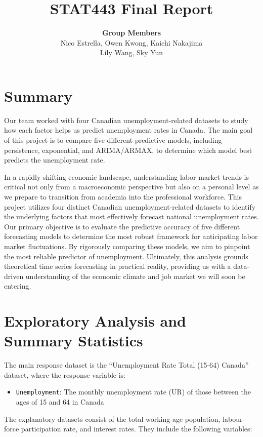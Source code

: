 \documentclass[]{article}
\title{STAT443 Final Report}
\author{
\textbf{Group Members}\\
Nico Estrella,
Owen Kwong,
Kaichi Nakajima\\
Lily Wang,
Sky Yun
}
\begin{document}
\maketitle

\section{Summary}
Our team worked with four Canadian unemployment-related datasets to study how each factor helps us predict unemployment rates in Canada. The main goal of this project is to compare five different predictive models, including persistence, exponential, and ARIMA/ARMAX, to determine which model best predicts the unemployment rate.

In a rapidly shifting economic landscape, understanding labor market trends is critical not only from a macroeconomic perspective but also on a personal level as we prepare to transition from academia into the professional workforce. This project utilizes four distinct Canadian unemployment-related datasets to identify the underlying factors that most effectively forecast national unemployment rates. Our primary objective is to evaluate the predictive accuracy of five different forecasting models to determine the most robust framework for anticipating labor market fluctuations. By rigorously comparing these models, we aim to pinpoint the most reliable predictor of unemployment. Ultimately, this analysis grounds theoretical time series forecasting in practical reality, providing us with a data-driven understanding of the economic climate and job market we will soon be entering.

\section{Exploratory Analysis and Summary Statistics}

The main response dataset is the “Unemployment Rate Total (15-64) Canada” dataset, where the response variable is:
\vspace{0.3cm}
\begin{itemize}
\item \texttt{Unemployment}: The monthly unemployment rate (UR) of those between the ages of 15 and 64 in Canada 
\end{itemize}
\vspace{0.3cm}



The explanatory datasets consist of the total working-age population, labour-force participation rate, and interest rates. They include the following variables:
\end{document}
